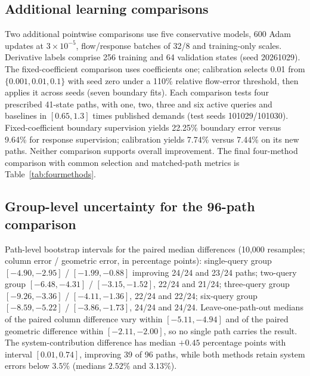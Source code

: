 \subsection{Additional learning comparisons}\label{app:legacy-learning}\label{app:learning-protocol}\label{app:calibration-protocol}
Two additional pointwise comparisons use five conservative models, 600 Adam updates at $3\times10^{-5}$, flow/response batches of 32/8 and training-only scales. Derivative labels comprise 256 training and 64 validation states (seed 20261029). The fixed-coefficient comparison uses coefficients one; calibration selects 0.01 from $\{0.001,0.01,0.1\}$ with seed zero under a 110\% relative flow-error threshold, then applies it across seeds (seven boundary fits). Each comparison tests four prescribed 41-state paths, with one, two, three and six active queries and baselines in $[0.65,1.3]$ times published demands (test seeds 101029/101030). Fixed-coefficient boundary supervision yields 22.25\% boundary error versus 9.64\% for response supervision; calibration yields 7.74\% versus 7.44\% on its new paths. Neither
comparison supports overall improvement. The final four-method
comparison with common selection and matched-path metrics is
Table~\ref{tab:fourmethods}.

\subsection{Group-level uncertainty for the 96-path comparison}\label{supp:learningdetail}
Path-level bootstrap intervals for the paired median differences
(10,000 resamples; column error / geometric error, in percentage
points): single-query group $[-4.90,-2.95]$ / $[-1.99,-0.88]$
improving 24/24 and 23/24 paths; two-query group $[-6.48,-4.31]$ /
$[-3.15,-1.52]$, 22/24 and 21/24; three-query group $[-9.26,-3.36]$ /
$[-4.11,-1.36]$, 22/24 and 22/24; six-query group $[-8.59,-5.22]$ /
$[-3.86,-1.73]$, 24/24 and 24/24. Leave-one-path-out medians of the
paired column difference vary within $[-5.11,-4.94]$ and of the paired
geometric difference within $[-2.11,-2.00]$, so no single path carries
the result. The system-contribution difference has median $+0.45$
percentage points with interval $[0.01,0.74]$, improving 39 of 96
paths, while both methods retain system errors below $3.5\%$ (medians
$2.52\%$ and $3.13\%$).

